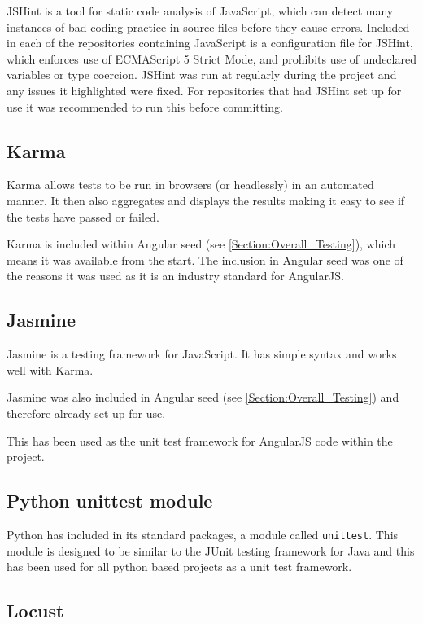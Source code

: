 JSHint is a tool for static code analysis of JavaScript, which can detect many instances of bad coding practice in source files before they cause errors. Included in each of the repositories containing JavaScript is a configuration file for JSHint, which enforces use of ECMAScript 5 Strict Mode, and prohibits use of undeclared variables or type coercion. JSHint was run at regularly during the project and any issues it highlighted were fixed. For repositories that had JSHint set up for use it was recommended to run this before committing.

\subsection{Karma}

Karma allows tests to be run in browsers (or headlessly) in an automated manner.  It then also aggregates and displays the results making it easy to see if the tests have passed or failed.

Karma is included within Angular seed (see \autoref{Section:Overall_Testing}), which means it was available from the start. The inclusion in Angular seed was one of the reasons it was used as it is an industry standard for AngularJS.

\subsection{Jasmine}

Jasmine is a testing framework for JavaScript. It has simple syntax and works well with Karma.

Jasmine was also included in Angular seed (see \autoref{Section:Overall_Testing}) and therefore already set up for use.

This has been used as the unit test framework for AngularJS code within the project.

\subsection{Python unittest module}

Python has included in its standard packages, a module called \lstinline|unittest|. This module is designed to be similar to the JUnit testing framework for Java and this has been used for all python based projects as a unit test framework.

\subsection{Locust}

